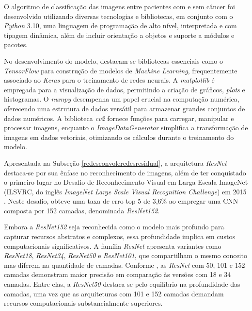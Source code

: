 O algoritmo de classificação das imagens entre pacientes com e sem câncer foi desenvolvido utilizando diversas tecnologias e bibliotecas, em conjunto com o \textit{Python} 3.10, uma linguagem de programação de alto nível, interpretada e com tipagem dinâmica, além de incluir orientação a objetos e suporte a módulos e pacotes.

No desenvolvimento do modelo, destacam-se bibliotecas essenciais como o \textit{TensorFlow} para construção de modelos de \textit{Machine Learning}, frequentemente associado ao \textit{Keras} para o treinamento de redes neurais. A \textit{matplotlib} é empregada para a visualização de dados, permitindo a criação de gráficos, \textit{plots} e histogramas. O \textit{numpy} desempenha um papel crucial na computação numérica, oferecendo uma estrutura de dados versátil para armazenar grandes conjuntos de dados numéricos. A biblioteca \textit{cv2} fornece funções para carregar, manipular e processar imagens, enquanto o \textit{ImageDataGenerator} simplifica a transformação de imagens em dados vetoriais, otimizando os cálculos durante o treinamento do modelo.

Apresentada na Subseção \ref{redesconvoleredesresidual}, a arquitetura \textit{ResNet} destaca-se por sua ênfase no reconhecimento de imagens, além de ter conquistado o primeiro lugar no Desafio de Reconhecimento Visual em Larga Escala ImageNet (ILSVRC, do inglês \textit{ImageNet Large Scale Visual Recognition Challenge}) em 2015 \cite{resnet50analisys}. Neste desafio, obteve uma taxa de erro top 5 de 3,6\% ao empregar uma CNN composta por 152 camadas, denominada \textit{ResNet152}.

Embora a \textit{ResNet152} seja reconhecida como o modelo mais profundo para capturar recursos abstratos e complexos, essa profundidade implica em custos computacionais significativos. A família \textit{ResNet} apresenta variantes como \textit{ResNet18}, \textit{ResNet34}, \textit{ResNet50} e \textit{ResNet101}, que compartilham o mesmo conceito mas diferem na quantidade de camadas. Conforme , as \textit{ResNet} com 50, 101 e 152 camadas demonstram maior precisão em comparação às versões com 18 e 34 camadas. Entre elas, a \textit{ResNet50} destaca-se pelo equilíbrio na profundidade das camadas, uma vez que as arquiteturas com 101 e 152 camadas demandam recursos computacionais substancialmente superiores.





